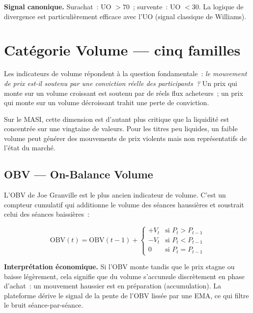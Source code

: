 \textbf{Signal canonique.}
Surachat~: UO $> 70$~; survente~: UO $< 30$. La logique de divergence est
particulièrement efficace avec l'UO (signal classique de Williams).

\section{Catégorie Volume — cinq familles}
\label{sec:at_volume}

Les indicateurs de volume répondent à la question fondamentale~: \textit{le mouvement
de prix est-il soutenu par une conviction réelle des participants~?} Un prix qui monte
sur un volume croissant est soutenu par de réels flux acheteurs~; un prix qui monte
sur un volume décroissant trahit une perte de conviction.

Sur le MASI, cette dimension est d'autant plus critique que la liquidité est
concentrée sur une vingtaine de valeurs. Pour les titres peu liquides, un faible volume
peut générer des mouvements de prix violents mais non représentatifs de l'état du marché.

\subsection{OBV — On-Balance Volume}

L'OBV de Joe Granville est le plus ancien indicateur de volume. C'est un compteur
cumulatif qui additionne le volume des séances haussières et soustrait celui des
séances baissières~:

\begin{equation}
    \text{OBV}(t) = \text{OBV}(t-1) +
    \begin{cases}
        +V_t & \text{si } P_t > P_{t-1} \\
        -V_t & \text{si } P_t < P_{t-1} \\
        0    & \text{si } P_t = P_{t-1}
    \end{cases}
    \label{eq:obv}
\end{equation}

\textbf{Interprétation économique.}
Si l'OBV monte tandis que le prix stagne ou baisse légèrement, cela signifie que du
volume s'accumule discrètement en phase d'achat~: un mouvement haussier est en préparation
(accumulation). La plateforme dérive le signal de la pente de l'OBV lissée par une
EMA, ce qui filtre le bruit séance-par-séance.

